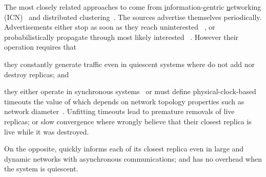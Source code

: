 \begin{asparadesc}



\noindent The most closely related approaches to \NAME come from
\underline{i}nformation-\underline{c}entric \underline{n}etworking
(ICN)~\cite{garcia-lopez, hemmati2015namebased} and distributed
clustering~\cite{sohier2012physarum}. The sources advertise themselves
periodically. Advertisements either stop as soon as they reach
uninterested \processes~\cite{garcia-lopez, hemmati2015namebased}, or
probabilistically propagate through most likely interested
\processes~\cite{sohier2012physarum}. However their operation requires
that
\begin{inparaenum}[(i)]
\item they constantly generate traffic even in quiescent systems where
  \processes do not add nor destroy replicas; and 
\item they either operate in synchronous
  systems~\cite{sohier2012physarum} or must define
  physical-clock-based timeouts the value of which depends on network
  topology properties such as network diameter~\cite{garcia-lopez,
    hemmati2015namebased}.
  Unfitting timeouts lead to premature removals of live replicas; or
  slow convergence where \processes wrongly believe that their closest
  replica is live while it was destroyed.
\end{inparaenum}
On the opposite, \NAME quickly informs each \process of its closest
replica even in large and dynamic networks with asynchronous
communications; and has no overhead when the system is quiescent.

\end{asparadesc}

